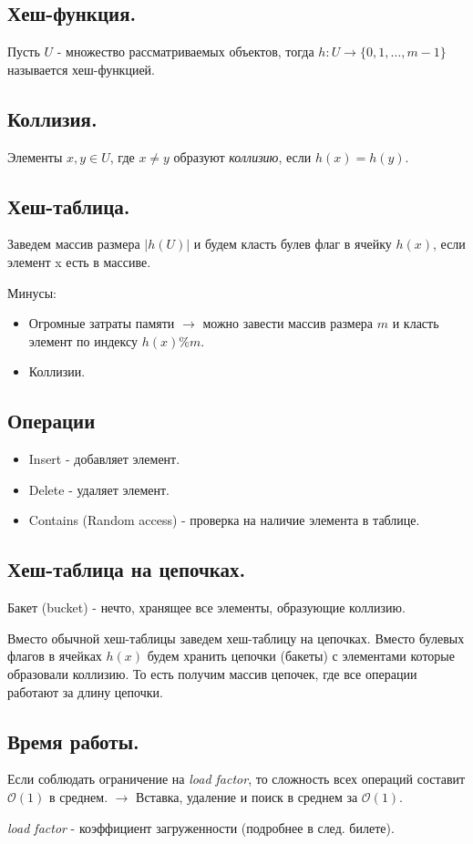 \subsection*{Хеш-функция.}

\Def Пусть $U$ - множество рассматриваемых объектов, тогда $h: U \rightarrow \{0, 1, \dots, m - 1\}$ называется хеш-функцией.

\subsection*{Коллизия.}

\Def Элементы $x, y \in U$, где $x \neq y$ образуют \textit{коллизию}, если $h(x) = h(y)$.

\subsection*{Хеш-таблица.}

Заведем массив размера $|h(U)|$ и будем класть булев флаг в ячейку $h(x)$, если элемент x 
есть в массиве. 

Минусы:
\begin{itemize}
    \item Огромные затраты памяти $\rightarrow$ можно завести массив размера $m$ и класть элемент по индексу $h(x) \% m$.
    \item Коллизии.
\end{itemize}

\subsection*{Операции}
\begin{itemize}
    \item Insert - добавляет элемент.
    \item Delete - удаляет элемент.
    \item Contains (Random access) - проверка на наличие элемента в таблице.
\end{itemize}

\subsection*{Хеш-таблица на цепочках.}

\Def Бакет (bucket) - нечто, хранящее все элементы, образующие коллизию.

Вместо обычной хеш-таблицы заведем хеш-таблицу на цепочках. Вместо булевых флагов в ячейках $h(x)$ будем хранить цепочки (бакеты) с элементами которые образовали коллизию. То есть получим массив цепочек, где все операции работают за длину цепочки.

\subsection*{Время работы.}

Если соблюдать ограничение на \textit{load factor}, то сложность всех операций составит $\mathcal{O}(1)$ в среднем. 
\newline 
$\rightarrow$ Вставка, удаление и поиск в среднем за $\mathcal{O}(1)$.

\Note \textit{load factor} - коэффициент загруженности (подробнее в след. билете).

\pagebreak